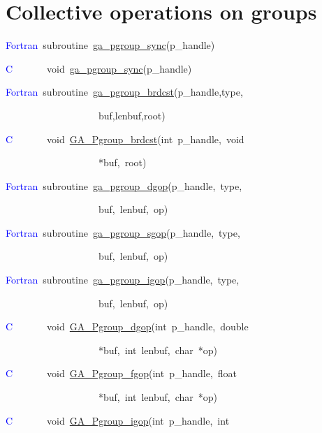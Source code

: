 \section{Collective operations on groups}
\textcolor{blue}{Fortran}~subroutine~\href{https://hpc.pnl.gov/globalarrays/api/f_op_api.html\#GA_PGROUP_SYNC}{ga\_{}pgroup\_{}sync}(p\_handle)

\textcolor{blue}{C}~~~~~~~void~\href{https://hpc.pnl.gov/globalarrays/api/f_op_api.html\#GA_PGROUP_SYNC}{ga\_{}pgroup\_{}sync}(p\_handle)

\textcolor{blue}{Fortran}~subroutine~\href{https://hpc.pnl.gov/globalarrays/api/f_op_api.html\#GA_PGROUP_BRDCST}{ga\_{}pgroup\_{}brdcst}(p\_handle,type,

~~~~~~~~~~~~~~~~~~~buf,lenbuf,root)

\textcolor{blue}{C}~~~~~~~void~\href{https://hpc.pnl.gov/globalarrays/api/f_op_api.html\#GA_PGROUP_BRDCST}{GA\_{}Pgroup\_{}brdcst}(int~p\_handle,~void~

~~~~~~~~~~~~~~~~~~~{*}buf,~root)

\textcolor{blue}{Fortran}~subroutine~\href{https://hpc.pnl.gov/globalarrays/api/f_op_api.html\#GA_PGROUP_DGOP}{ga\_{}pgroup\_{}dgop}(p\_handle,~type,~

~~~~~~~~~~~~~~~~~~~buf,~lenbuf,~op)

\textcolor{blue}{Fortran}~subroutine~\href{https://hpc.pnl.gov/globalarrays/api/f_op_api.html\#GA_PGROUP_SGOP}{ga\_{}pgroup\_{}sgop}(p\_handle,~type,~

~~~~~~~~~~~~~~~~~~~buf,~lenbuf,~op)

\textcolor{blue}{Fortran}~subroutine~\href{https://hpc.pnl.gov/globalarrays/api/f_op_api.html\#GA_PGROUP_IGOP}{ga\_{}pgroup\_{}igop}(p\_handle,~type,~

~~~~~~~~~~~~~~~~~~~buf,~lenbuf,~op)

\textcolor{blue}{C}~~~~~~~void~\href{https://hpc.pnl.gov/globalarrays/api/c_op_api.html\#GA_PGROUP_DGOP}{GA\_{}Pgroup\_{}dgop}(int~p\_handle,~double~

~~~~~~~~~~~~~~~~~~~{*}buf,~int~lenbuf,~char~{*}op)

\textcolor{blue}{C}~~~~~~~void~\href{https://hpc.pnl.gov/globalarrays/api/c_op_api.html\#GA_PGROUP_FGOP}{GA\_{}Pgroup\_{}fgop}(int~p\_handle,~float~

~~~~~~~~~~~~~~~~~~~{*}buf,~int~lenbuf,~char~{*}op)

\textcolor{blue}{C}~~~~~~~void~\href{https://hpc.pnl.gov/globalarrays/api/c_op_api.html\#GA_PGROUP_IGOP}{GA\_{}Pgroup\_{}igop}(int~p\_handle,~int~

